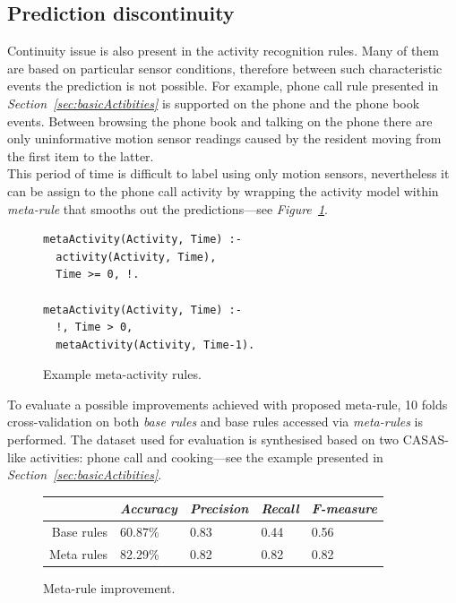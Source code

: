 \documentclass[10pt, a4paper, pdflatex, leqno, twoside, openright]{report}
\begin{document}
    \subsection{Prediction discontinuity\label{sec:predDis}}
Continuity issue is also present in the activity recognition rules. Many of them are based on particular sensor conditions, therefore between such characteristic events the prediction is not possible. For example, phone call rule presented in \emph{Section~\ref{sec:basicActibities}} is supported on the phone and the phone book events. Between browsing the phone book and talking on the phone there are only uninformative motion sensor readings caused by the resident moving from the first item to the latter.\\
This period of time is difficult to label using only motion sensors, nevertheless it can be assign to the phone call activity by wrapping the activity model within \emph{meta-rule} that smooths out the predictions---see \emph{Figure~\ref{lst:metaActivity}}.\\

\begin{figure}[htb]
  \begin{verbatim}
metaActivity(Activity, Time) :-
  activity(Activity, Time),
  Time >= 0, !.

metaActivity(Activity, Time) :-
  !, Time > 0,
  metaActivity(Activity, Time-1).
  \end{verbatim}
  \caption{Example meta-activity rules.\label{lst:metaActivity}}
\end{figure}

To evaluate a possible improvements achieved with proposed meta-rule, 10 folds cross-validation on both \emph{base rules} and base rules accessed via \emph{meta-rules} is performed. The dataset used for evaluation is synthesised based on two CASAS-like activities: phone call and cooking---see the example presented in \emph{Section~\ref{sec:basicActibities}}.\\

\begin{figure}[htb]
  \centering
  \begin{tabular}{ r | l l l l }
 & \emph{Accuracy} & \emph{Precision} & \emph{Recall} & \emph{F-measure}\\
\hline
Base rules & 60.87\% & 0.83 & 0.44 & 0.56\\
Meta rules & 82.29\% & 0.82 & 0.82 & 0.82 \\
  \end{tabular}
  \caption{Meta-rule improvement.\label{tab:metaImprovement}}
\end{figure}
\end{document}
